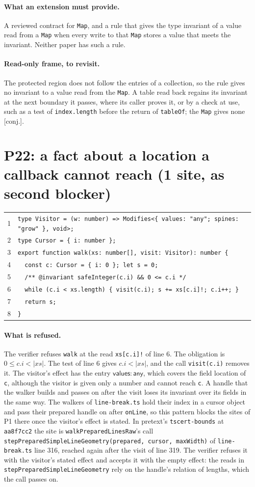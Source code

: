 \documentclass[10pt,a4paper]{article}
\theoremstyle{definition}
\theoremstyle{remark}
\newcommand{\kw}[1]{\mathsf{#1}}
\newcommand{\any}{\kw{any}}
\newcommand{\val}{\kw{values}}
\newcommand{\len}[1]{|#1|}
\newcommand{\code}[1]{\texttt{#1}}
\newcommand{\status}[1]{\textsf{\small[#1]}}
\newcommand{\entry}[1]{\paragraph{#1.}}
\begin{document}
\entry{What an extension must provide} A reviewed contract for \code{Map}, and a rule that
gives the type invariant of a value read from a \code{Map} when every
write to that \code{Map} stores a value that meets the invariant.
Neither paper has such a rule.

\entry{Read-only frame, to revisit} The protected region does not
follow the entries of a collection, so the rule gives no invariant to a
value read from the \code{Map}. A table read back regains its invariant
at the next boundary it passes, where its caller proves it, or by a
check at use, such as a test of \code{index.length} before the return
of \code{tableOf}; the \code{Map} gives none
\status{conj.}.

\section{P22: a fact about a location a callback cannot reach (1 site, as second blocker)}

{\footnotesize
\begin{tabular}{@{}r@{\hspace{1em}}l@{}}
1 & \code{type Visitor = (w: number) => Modifies<\{ values: "any"; spines: "grow" \}, void>;} \\
2 & \code{type Cursor = \{ i: number \};} \\
3 & \code{export function walk(xs: number[], visit: Visitor): number \{} \\
4 & \code{~~const c: Cursor = \{ i: 0 \}; let s = 0;} \\
5 & \code{~~/** @invariant safeInteger(c.i) \&\& 0 <= c.i */} \\
6 & \code{~~while (c.i < xs.length) \{ visit(c.i); s += xs[c.i]!; c.i++; \}} \\
7 & \code{~~return s;} \\
8 & \code{\}} \\
\end{tabular}}

\entry{What is refused} The verifier refuses \code{walk} at the read
\code{xs[c.i]!} of line 6. The obligation is
$0\le c.i<\len{\mathit{xs}}$. The test of line 6 gives
$c.i<\len{\mathit{xs}}$, and the call \code{visit(c.i)} removes it.
The visitor's effect has the entry $\val:\any$, which covers the field
location of \code{c}, although the visitor is given only a number and
cannot reach \code{c}. A handle that the walker builds and passes on
after the visit loses its invariant over its fields in the same way.
The walkers of \code{line-break.ts} hold their index in a cursor
object and pass their prepared handle on after \code{onLine}, so this
pattern blocks the sites of P1 there once the visitor's effect is
stated. In pretext's \code{tscert-bounds} at \code{aa8f7cc2} the site
is \code{walkPreparedLinesRaw}'s call
\code{stepPreparedSimpleLineGeometry(prepared, cursor, maxWidth)} of
\code{line-break.ts} line 316, reached again after the visit of line
319. The verifier refuses it with the visitor's stated effect and
accepts it with the empty effect: the reads in
\code{stepPreparedSimpleLineGeometry} rely on the handle's relation of
lengths, which the call passes on.
\end{document}
